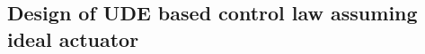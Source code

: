 \documentclass[table,10pt,red]{beamer}	%
\begin{document}
\subsection{Design of UDE based control law assuming ideal actuator} %

\end{document}
